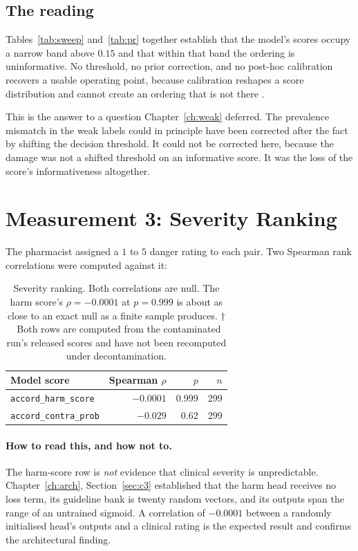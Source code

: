 \subsection{The reading}

Tables~\ref{tab:sweep} and~\ref{tab:pr} together establish that the model's
scores occupy a narrow band above $0.15$ and that within that band the ordering
is uninformative. No threshold, no prior correction, and no post-hoc calibration
recovers a usable operating point, because calibration reshapes a score
distribution and cannot create an ordering that is not there
\citep{guo2017calibration}.

This is the answer to a question Chapter~\ref{ch:weak} deferred. The prevalence
mismatch in the weak labels could in principle have been corrected after the
fact by shifting the decision threshold. It could not be corrected here, because
the damage was not a shifted threshold on an informative score. It was the loss
of the score's informativeness altogether.

\section{Measurement 3: Severity Ranking}
\label{sec:m3}

The pharmacist assigned a $1$ to $5$ danger rating to each pair. Two Spearman rank
correlations were computed against it:

\begin{table}[h]
\centering
\small
\begin{tabular}{lrrr}
\toprule
\textbf{Model score} & \textbf{Spearman $\rho$} & \textbf{$p$} & \textbf{$n$} \\
\midrule
\texttt{accord\_harm\_score}  & $-0.0001$ & 0.999 & 299 \\
\texttt{accord\_contra\_prob} & $-0.029$  & 0.62  & 299 \\
\bottomrule
\end{tabular}
\caption{Severity ranking. Both correlations are null. The harm score's
$\rho = -0.0001$ at $p = 0.999$ is about as close to an exact null as a finite
sample produces. $\dagger$~Both rows are computed from the contaminated run's
released scores and have not been recomputed under decontamination.}
\label{tab:severity}
\end{table}

\paragraph{How to read this, and how not to.} The harm-score row is \emph{not}
evidence that clinical severity is unpredictable. Chapter~\ref{ch:arch},
Section~\ref{sec:c3} established that the harm head receives no loss term, its
guideline bank is twenty random vectors, and its outputs span the range of an
untrained sigmoid. A correlation of $-0.0001$ between a randomly initialised
head's outputs and a clinical rating is the expected result and confirms the
architectural finding.

